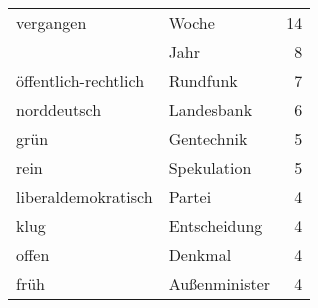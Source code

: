 \begin{tabular}{llr}
vergangen
 & Woche
 & 14 \\
 & Jahr
 & 8 \\
öffentlich-rechtlich
 & Rundfunk
 & 7 \\
norddeutsch
 & Landesbank
 & 6 \\
grün
 & Gentechnik
 & 5 \\
rein
 & Spekulation
 & 5 \\
liberaldemokratisch
 & Partei
 & 4 \\
klug
 & Entscheidung
 & 4 \\
offen
 & Denkmal
 & 4 \\
früh
 & Außenminister
 & 4 \\
\end{tabular}
